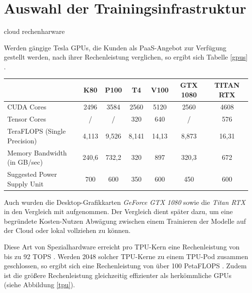 \section{Auswahl der Trainingsinfrastruktur}

cloud
rechenharware

Werden gängige Tesla GPUs, die Kunden als PaaS-Angebot zur Verfügung gestellt werden, nach ihrer Rechenleistung verglichen, so ergibt sich Tabelle \ref{gpus} \cite{TechPowerUp.20200209}.

\begin{center}
	\begin{tabular}[h]{l|c|c|c|c|c|c}
		& K80 & P100 & T4 & V100 & GTX 1080 & TITAN RTX \\
		\hline
		CUDA Cores & 2496 & 3584 & 2560 & 5120 & 2560 & 4608 \\
		Tensor Cores & / & / & 320 & 640 & / & 576 \\
		TeraFLOPS (Single Precision) & 4,113 & 9,526 & 8,141 & 14,13 & 8,873 & 16,31 \\
		Memory Bandwidth (in GB/sec) & 240,6 & 732,2 & 320 & 897 & 320,3 & 672 \\
		Suggested Power Supply Unit & 700 & 600 & 350 & 600 & 450 & 600
		\label{gpus}
	\end{tabular}
\end{center}

Auch wurden die Desktop-Grafikkarten \textit{GeForce GTX 1080} sowie die \textit{Titan RTX} in den Vergleich mit aufgenommen. Der Vergleich dient später dazu, um eine begründete Kosten-Nutzen Abwägung zwischen einem Trainieren der Modelle auf der Cloud oder lokal vollziehen zu können. 

Diese Art von Spezialhardware erreicht pro TPU-Kern eine Rechenleistung von bis zu 92 TOPS \cite{HaraldBogeholz.20170406}. Werden 2048 solcher TPU-Kerne zu einem TPU-Pod zusammen geschlossen, so ergibt sich eine Rechenleistung von über 100 PetaFLOPS \cite{GoogleCloud.20200209}. Zudem ist die größere Rechenleistung gleichzeitig effizienter als herkömmliche GPUs (siehe Abbildung \ref{tpu}).

